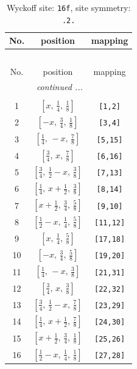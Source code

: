 \documentclass[fleqn,8pt]{jsarticle}
\begin{document}
\renewcommand{\arraystretch}{1.2}
\begin{longtable}{ccc}
\caption{Wyckoff site: {\tt 16f}, site symmetry: {\tt .2.}}
 \\
 \hline \hline
No. & position & mapping \\ \hline \endfirsthead

\multicolumn{2}{l}{\tablename\ \thetable{}} \\
 \hline \hline
No. & position & mapping \\ \hline \endhead

 \hline \hline
\multicolumn{2}{r}{\footnotesize\it continued ...} \\ \endfoot

 \hline \hline
\multicolumn{2}{r}{} \\ \endlastfoot

1 & $\left[ x,\, \frac{1}{4},\, \frac{1}{8} \right]$ & {\tt [1,2]} \\ \hline
2 & $\left[ - x,\, \frac{3}{4},\, \frac{1}{8} \right]$ & {\tt [3,4]} \\ \hline
3 & $\left[ \frac{1}{4},\, - x,\, \frac{7}{8} \right]$ & {\tt [5,15]} \\ \hline
4 & $\left[ \frac{3}{4},\, x,\, \frac{7}{8} \right]$ & {\tt [6,16]} \\ \hline
5 & $\left[ \frac{3}{4},\, \frac{1}{2} - x,\, \frac{3}{8} \right]$ & {\tt [7,13]} \\ \hline
6 & $\left[ \frac{1}{4},\, x + \frac{1}{2},\, \frac{3}{8} \right]$ & {\tt [8,14]} \\ \hline
7 & $\left[ x + \frac{1}{2},\, \frac{3}{4},\, \frac{5}{8} \right]$ & {\tt [9,10]} \\ \hline
8 & $\left[ \frac{1}{2} - x,\, \frac{1}{4},\, \frac{5}{8} \right]$ & {\tt [11,12]} \\ \hline
9 & $\left[ x,\, \frac{1}{4},\, \frac{5}{8} \right]$ & {\tt [17,18]} \\ \hline
10 & $\left[ - x,\, \frac{3}{4},\, \frac{5}{8} \right]$ & {\tt [19,20]} \\ \hline
11 & $\left[ \frac{1}{4},\, - x,\, \frac{3}{8} \right]$ & {\tt [21,31]} \\ \hline
12 & $\left[ \frac{3}{4},\, x,\, \frac{3}{8} \right]$ & {\tt [22,32]} \\ \hline
13 & $\left[ \frac{3}{4},\, \frac{1}{2} - x,\, \frac{7}{8} \right]$ & {\tt [23,29]} \\ \hline
14 & $\left[ \frac{1}{4},\, x + \frac{1}{2},\, \frac{7}{8} \right]$ & {\tt [24,30]} \\ \hline
15 & $\left[ x + \frac{1}{2},\, \frac{3}{4},\, \frac{1}{8} \right]$ & {\tt [25,26]} \\ \hline
16 & $\left[ \frac{1}{2} - x,\, \frac{1}{4},\, \frac{1}{8} \right]$ & {\tt [27,28]} \\
\end{longtable}
\end{document}
